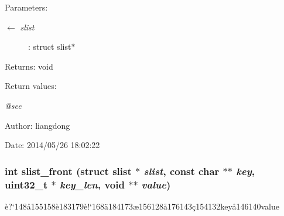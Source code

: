\begin{Desc}
\item[Parameters:]
\begin{description}
\item[\mbox{$\leftarrow$} {\em slist}]: struct slist$\ast$ \end{description}
\end{Desc}
\begin{Desc}
\item[Returns:]void \end{Desc}
\begin{Desc}
\item[Return values:]
\begin{description}
\item[{\em @see}]\end{description}
\end{Desc}
\begin{Desc}
\item[Author:]liangdong \end{Desc}
\begin{Desc}
\item[Date:]2014/05/26 18:02:22 \end{Desc}
\subsubsection{\setlength{\rightskip}{0pt plus 5cm}int slist\_\-front (struct slist $\ast$ {\em slist}, const char $\ast$$\ast$ {\em key}, uint32\_\-t $\ast$ {\em key\_\-len}, void $\ast$$\ast$ {\em value})}\label{slist_8h_a5}


\`{e}?`148\aa{}155158\`{e}183179\`{e}!`168\"{a}184173\ae{}156128\aa{}176143\c{c}154132key\aa{}146140value 


